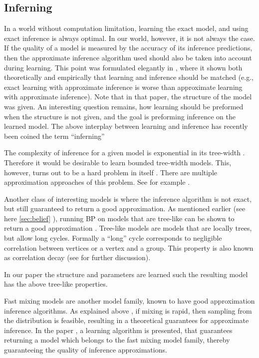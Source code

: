 \subsection{Inferning}
\label{sec:inferning}
In a world without computation limitation, learning the exact model,
and using exact inference is always optimal. In our world, however, it
is not always the case.  If the quality of a model is measured by the accuracy
of its inference predictions, then the approximate inference algorithm used
should also be taken into account during learning. This point was formulated
elegantly in \cite{wainwright2006estimating}, where it shown both theoretically and empirically that learning and inference should be matched (e.g., exact learning with approximate inference is worse than approximate learning with approximate inference). Note that in that paper, the structure of the model was given.  An interesting question remains, how learning should be preformed when
the structure is not given, and the goal is preforming inference on
the learned model.
The above interplay between learning and inference has recently been coined the term ``inferning''\cite{rohanimanesh2009training}

The complexity of inference for a given model is exponential in its tree-width \cite{robertson1983graph,robertson1994quickly}.
Therefore it would be desirable to learn bounded tree-width models.
This, however, turns out to be a hard problem in itself \cite{srebro2001maximum}. There are multiple approximation approaches of this problem. See for example \cite{karger2001learning,bach2001thin,elidan2009learning}.
%

Another class of interesting models is where the inference algorithm is not exact, but still guaranteed to return a good approximation. 
As mentioned earlier (see here \ref{sec:belief} ), running BP on models that are tree-like can be shown to return a good approximation \cite{dembo2010ising}.
Tree-like models are models that are locally trees, but allow long cycles.
Formally a ``long'' cycle corresponds to negligible correlation between vertices or a vertex and a group. This property is also known as correlation decay (see  for further discussion).
In our paper \cite{heinemann2014inferning} the structure and parameters are learned such the resulting model has the above tree-like properties.
%

Fast mixing models are another model family,  known to have good approximation inference algorithms.
As explained above  , if mixing is rapid, then sampling from the distribution is feasible, resulting in a theoretical guarantees for approximate inference. 
In the paper \cite{domke2015maximum}, a learning algorithm is presented, that guarantees returning a model which belongs to the fast mixing model family,
thereby guaranteeing the quality of inference approximations.
